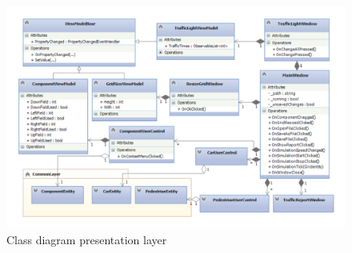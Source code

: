 \begin{landscape}
	\begin{figure}[!ht]
		\centering
		\includegraphics[height=\textheight]{figures/PresentationLayer}
		\caption{Class diagram presentation layer}
		\label{fig:pres}
	\end{figure}
\end{landscape}




